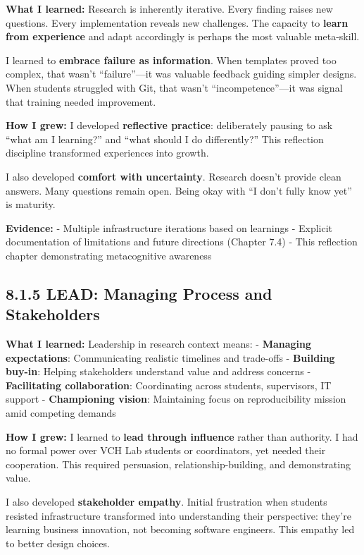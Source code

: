 \documentclass[
  oneside,
  open=any]{scrbook}
\begin{document}
\textbf{What I learned:} Research is inherently iterative. Every finding
raises new questions. Every implementation reveals new challenges. The
capacity to \textbf{learn from experience} and adapt accordingly is
perhaps the most valuable meta-skill.

I learned to \textbf{embrace failure as information}. When templates
proved too complex, that wasn't ``failure''---it was valuable feedback
guiding simpler designs. When students struggled with Git, that wasn't
``incompetence''---it was signal that training needed improvement.

\textbf{How I grew:} I developed \textbf{reflective practice}:
deliberately pausing to ask ``what am I learning?'' and ``what should I
do differently?'' This reflection discipline transformed experiences
into growth.

I also developed \textbf{comfort with uncertainty}. Research doesn't
provide clean answers. Many questions remain open. Being okay with ``I
don't fully know yet'' is maturity.

\textbf{Evidence:} - Multiple infrastructure iterations based on
learnings - Explicit documentation of limitations and future directions
(Chapter 7.4) - This reflection chapter demonstrating metacognitive
awareness

\subsection{8.1.5 LEAD: Managing Process and
Stakeholders}\label{lead-managing-process-and-stakeholders}

\textbf{What I learned:} Leadership in research context means: -
\textbf{Managing expectations}: Communicating realistic timelines and
trade-offs - \textbf{Building buy-in}: Helping stakeholders understand
value and address concerns - \textbf{Facilitating collaboration}:
Coordinating across students, supervisors, IT support -
\textbf{Championing vision}: Maintaining focus on reproducibility
mission amid competing demands

\textbf{How I grew:} I learned to \textbf{lead through influence} rather
than authority. I had no formal power over VCH Lab students or
coordinators, yet needed their cooperation. This required persuasion,
relationship-building, and demonstrating value.

I also developed \textbf{stakeholder empathy}. Initial frustration when
students resisted infrastructure transformed into understanding their
perspective: they're learning business innovation, not becoming software
engineers. This empathy led to better design choices.
\end{document}
